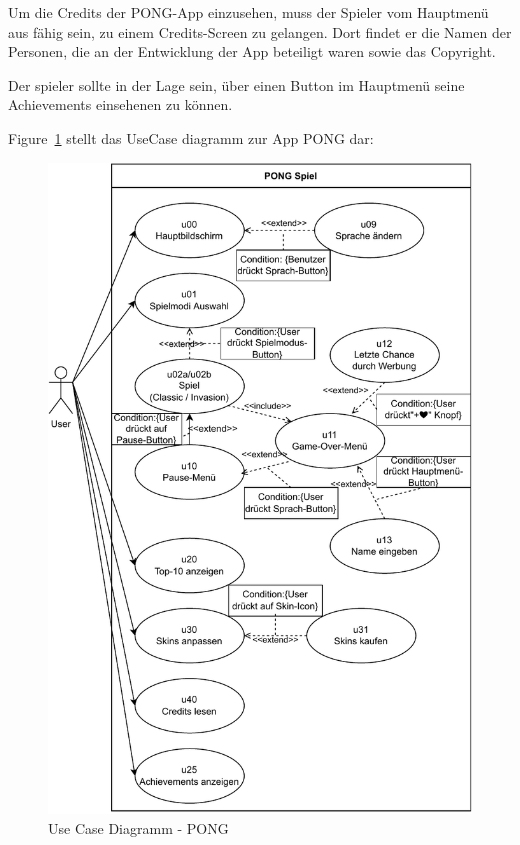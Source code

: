 Um die Credits der PONG-App einzusehen, \gls{muss} der Spieler vom Hauptmenü aus fähig sein, zu einem Credits-Screen zu gelangen. Dort findet er die Namen der Personen, die an der Entwicklung der App beteiligt waren sowie das Copyright.

Der \gls{spieler} \gls{sollte} in der Lage sein, über einen Button im Hauptmenü seine Achievements einsehenen zu können.

Figure~\ref{fig:use-case-diagram} stellt das UseCase diagramm zur App PONG dar:

\begin{figure}[h!]
    \includegraphics[width=\textwidth]{diagramme/pdf/UML-K4-UseCase.pdf}
    \caption{Use Case Diagramm - PONG}
    \label{fig:use-case-diagram}
\end{figure}

\clearpage